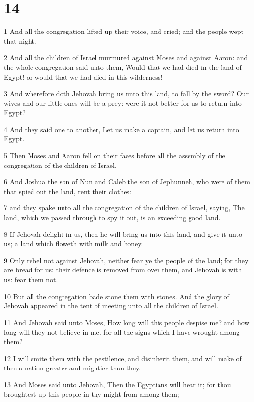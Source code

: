 \chapter{14}

\par 1 And all the congregation lifted up their voice, and cried; and the people wept that night.
\par 2 And all the children of Israel murmured against Moses and against Aaron: and the whole congregation said unto them, Would that we had died in the land of Egypt! or would that we had died in this wilderness!
\par 3 And wherefore doth Jehovah bring us unto this land, to fall by the sword? Our wives and our little ones will be a prey: were it not better for us to return into Egypt?
\par 4 And they said one to another, Let us make a captain, and let us return into Egypt.
\par 5 Then Moses and Aaron fell on their faces before all the assembly of the congregation of the children of Israel.
\par 6 And Joshua the son of Nun and Caleb the son of Jephunneh, who were of them that spied out the land, rent their clothes:
\par 7 and they spake unto all the congregation of the children of Israel, saying, The land, which we passed through to spy it out, is an exceeding good land.
\par 8 If Jehovah delight in us, then he will bring us into this land, and give it unto us; a land which floweth with milk and honey.
\par 9 Only rebel not against Jehovah, neither fear ye the people of the land; for they are bread for us: their defence is removed from over them, and Jehovah is with us: fear them not.
\par 10 But all the congregation bade stone them with stones. And the glory of Jehovah appeared in the tent of meeting unto all the children of Israel.
\par 11 And Jehovah said unto Moses, How long will this people despise me? and how long will they not believe in me, for all the signs which I have wrought among them?
\par 12 I will smite them with the pestilence, and disinherit them, and will make of thee a nation greater and mightier than they.
\par 13 And Moses said unto Jehovah, Then the Egyptians will hear it; for thou broughtest up this people in thy might from among them;

